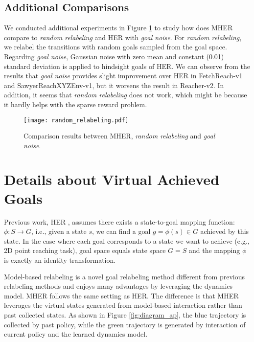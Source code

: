\documentclass{article}
\begin{document}
\subsection{Additional Comparisons}
We conducted additional experiments in Figure \ref{fig:random_relabeling} to study how does MHER compare to \emph{random relabeling} and HER with \emph{goal noise}. For \emph{random relabeling}, we relabel the transitions with random goals sampled from the goal space. Regarding \emph{goal noise}, Gaussian noise with zero mean and constant (0.01) standard deviation is applied to hindsight goals of HER. We can observe from the results that \emph{goal noise} provides slight improvement over HER in FetchReach-v1 and SawyerReachXYZEnv-v1, but it worsens the result in Reacher-v2. In addition, it seems that \emph{random relabeling} does not work, which might be because it hardly helps with the sparse reward problem.


\begin{figure}[h]
    \centering
    \texttt{[image: random\_relabeling.pdf]}
    \caption{Comparison results between MHER, \emph{random relabeling} and \emph{goal noise}.}
    \label{fig:random_relabeling}
\end{figure}


\section{Details about Virtual Achieved Goals}
\label{ap:virtual_ags}
Previous work, HER \cite{andrychowicz2017hindsight}, assumes there exists a state-to-goal mapping function: $\phi:S\rightarrow G$, i.e., given a state $s$, we can find a goal $g=\phi(s) \in G$ achieved by this state. In the case where each goal corresponds to a state we want to achieve (e.g., 2D point reaching task), goal space equals state space $G=S$ and the mapping $\phi$ is exactly an identity transformation.

Model-based relabeling is a novel goal relabeling method different from previous relabeling methods and enjoys many advantages by leveraging the dynamics model. MHER follows the same setting as HER. The difference is that MHER leverages the virtual states generated from model-based interaction rather than past collected states. As shown in Figure \ref{fig:diagram_ap}, the blue trajectory is collected by past policy, while the green trajectory is generated by interaction of current policy and the learned dynamics model. 
\end{document}
